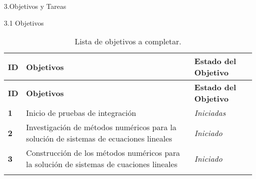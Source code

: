 \documentclass[12pt]{report}
\numberwithin{equation}{section}
\begin{document}
\begin{flushleft}
\large{3.Objetivos y Tareas}\\
\vspace{1em}


\large{3.1 Objetivos}\\
\vspace{1em}

\begin{longtable}[H]{|m{0.5cm}|m{7cm}|m{5.5cm}|}
\hline
\small{\textbf{ID}} & \small{\textbf{Objetivos}} & \small{\textbf{Estado del Objetivo}} \\
\hline \hline
\endfirsthead
\hline
\small{\textbf{ID}} & \small{\textbf{Objetivos}} & \small{\textbf{Estado del Objetivo}} \\
\hline \hline
\endhead
\hline
\endfoot

\endlastfoot
\textbf{1}  & \small{Inicio de pruebas de integraci\'on } & \small{\textit{Iniciadas}}\\
\hline 
\textbf{2}  & \small{Investigaci\'on de métodos numéricos para la soluci\'on de sistemas de ecuaciones lineales} & \small{\textit{Iniciado}}\\
\hline 
\textbf{3}  & \small{Construcci\'on de los métodos numéricos para la soluci\'on de sistemas de cuaciones lineales} & \small{\textit{Iniciado}}\\
\hline
\hline
\caption{{\footnotesize Lista de objetivos a completar.}}
\label{tabla: TABLA CE quinta plan}
\end{longtable}



\end{flushleft}
\end{document}
